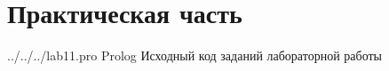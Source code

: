 \chapter*{Практическая часть}

	{../../../lab11.pro} %
	{Prolog} %
	{Исходный код заданий лабораторной работы} %

